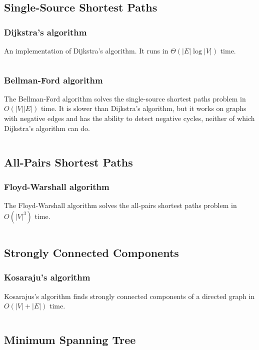 \documentclass[9pt,a4paper]{amsart}
\newcommand{\code}[1]{\inputminted[linenos]{cpp}{_code/#1}}
\begin{document}
    \subsection{Single-Source Shortest Paths}
        \subsubsection{Dijkstra's algorithm}
            An implementation of Dijkstra's algorithm. It runs in
            $\Theta(|E|\log{|V|})$ time.
            \code{graph/dijkstra.cpp}

        \subsubsection{Bellman-Ford algorithm}
            The Bellman-Ford algorithm solves the single-source shortest paths
            problem in $O(|V||E|)$ time. It is slower than Dijkstra's
            algorithm, but it works on graphs with negative edges and has the
            ability to detect negative cycles, neither of which Dijkstra's
            algorithm can do.
            \code{graph/bellman_ford.cpp}

    \subsection{All-Pairs Shortest Paths}
        \subsubsection{Floyd-Warshall algorithm}
            The Floyd-Warshall algorithm solves the all-pairs shortest paths
            problem in $O(|V|^3)$ time.
            \code{graph/floyd_warshall.cpp}

    \subsection{Strongly Connected Components}
        \subsubsection{Kosaraju's algorithm}
            Kosarajus's algorithm finds strongly connected components of a
            directed graph in $O(|V|+|E|)$ time.
            \code{graph/scc.cpp}

    \subsection{Minimum Spanning Tree}
\end{document}

